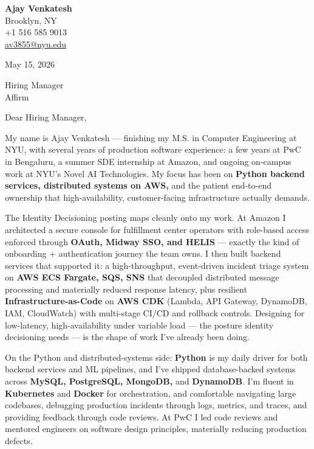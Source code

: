 \documentclass[letterpaper,11pt]{article}
\begin{document}
\begin{flushleft}
\textbf{\large Ajay Venkatesh} \\
Brooklyn, NY \\
+1 516 585 9013 \\
\href{mailto:av3855@nyu.edu}{av3855@nyu.edu}
\end{flushleft}

\vspace{10pt}

May 15, 2026

\vspace{6pt}

Hiring Manager \\
Affirm

\vspace{10pt}

Dear Hiring Manager,

My name is Ajay Venkatesh --- finishing my M.S. in Computer Engineering at NYU, with several years of production software experience: a few years at PwC in Bengaluru, a summer SDE internship at Amazon, and ongoing on-campus work at NYU's Novel AI Technologies. My focus has been on \textbf{Python backend services, distributed systems on AWS,} and the patient end-to-end ownership that high-availability, customer-facing infrastructure actually demands.

The Identity Decisioning posting maps cleanly onto my work. At Amazon I architected a secure console for fulfillment center operators with role-based access enforced through \textbf{OAuth, Midway SSO, and HELIS} --- exactly the kind of onboarding + authentication journey the team owns. I then built backend services that supported it: a high-throughput, event-driven incident triage system on \textbf{AWS ECS Fargate, SQS, SNS} that decoupled distributed message processing and materially reduced response latency, plus resilient \textbf{Infrastructure-as-Code} on \textbf{AWS CDK} (Lambda, API Gateway, DynamoDB, IAM, CloudWatch) with multi-stage CI/CD and rollback controls. Designing for low-latency, high-availability under variable load --- the posture identity decisioning needs --- is the shape of work I've already been doing.

On the Python and distributed-systems side: \textbf{Python} is my daily driver for both backend services and ML pipelines, and I've shipped database-backed systems across \textbf{MySQL, PostgreSQL, MongoDB,} and \textbf{DynamoDB}. I'm fluent in \textbf{Kubernetes} and \textbf{Docker} for orchestration, and comfortable navigating large codebases, debugging production incidents through logs, metrics, and traces, and providing feedback through code reviews. At PwC I led code reviews and mentored engineers on software design principles, materially reducing production defects.
\end{document}
